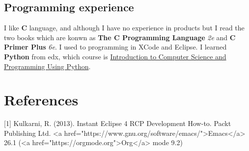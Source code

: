 \documentclass[11pt]{article}
\begin{document}
\subsection*{Programming experience}
\label{sec:org699c0d0}
I like \textbf{C} language, and although I have no experience in products but I read the two books which are konwn as
 \textbf{The C Programming Language} \emph{2e} and
\textbf{C Primer Plus} \emph{6e}. I used to programming in XCode and Eclipse.
I learned \textbf{Python} from edx, which course is
 \href{https://www.edx.org/course/introduction-to-computer-science-and-programming-using-python-0}{Introduction to Computer Science and Programming Using Python}.

\section*{References}
\label{sec:orgee193f9}
[1] Kulkarni, R. (2013). Instant Eclipse 4 RCP Development How-to. Packt Publishing Ltd.
<a href="https://www.gnu.org/software/emacs/">Emacs</a> 26.1 (<a href="https://orgmode.org">Org</a> mode 9.2)
\end{document}
